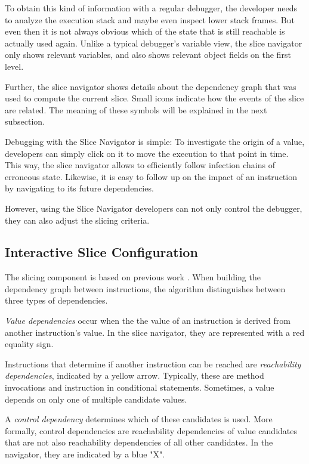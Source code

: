 ﻿\documentclass[
      english,
			conference,
      ]{IEEEtran}
\newcommand{\todo}[2][]{\pdfmargincomment[color=orange,icon=Note,subject={TODO},author={#1}]{#2}}
\begin{document}
To obtain this kind of information with a regular debugger, the developer needs to analyze the execution stack and maybe even inspect lower stack frames.
But even then it is not always obvious which of the state that is still reachable is actually used again.
Unlike a typical debugger's variable view, the slice navigator only shows relevant variables, and also shows relevant object fields on the first level.

Further, the slice navigator shows details about the dependency graph that was used to compute the current slice.
Small icons indicate how the events of the slice are related.
The meaning of these symbols will be explained in the next subsection.

Debugging with the Slice Navigator is simple:
To investigate the origin of a value, developers can simply click on it to move the execution to that point in time.
This way, the slice navigator allows to efficiently follow infection chains of erroneous state.
Likewise, it is easy to follow up on the impact of an instruction by navigating to its future dependencies.

However, using the Slice Navigator developers can not only control the debugger, they can also adjust the slicing criteria.

\subsection{Interactive Slice Configuration}

The slicing component is based on previous work \todo{[xxx]}.
When building the dependency graph between instructions, the algorithm distinguishes between three types of dependencies.

\emph{Value dependencies} occur when the the value of an instruction is derived from another instruction's value.
In the slice navigator, they are represented with a red equality sign.

Instructions that determine if another instruction can be reached are \emph{reachability dependencies}, indicated by a yellow arrow.
Typically, these are method invocations and instruction in conditional statements.
Sometimes, a value depends on only one of multiple candidate values. 

A \emph{control dependency} determines which of these candidates is used.
More formally, control dependencies are reachability dependencies of value candidates that are not also reachability dependencies of all other candidates.
In the navigator, they are indicated by a blue "X".
\end{document}
